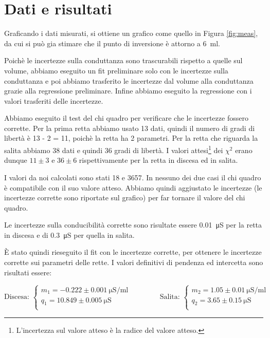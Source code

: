 \section*{Dati e risultati}

Graficando i dati misurati, si ottiene un grafico come quello in Figura \ref{fig:meas}, da cui si può gia stimare
che il punto di inversione è attorno a \SI{6}{\milli\litre}.

Poichè le incertezze sulla conduttanza sono trascurabili rispetto a quelle sul volume, abbiamo eseguito un fit preliminare
solo con le incertezze sulla conduttanza e poi abbiamo trasferito le incertezze dal volume alla conduttanza grazie alla regressione preliminare.
Infine abbiamo eseguito la regressione con i valori trasferiti delle incertezze. 


Abbiamo eseguito il test del chi quadro per verificare che le incertezze fossero corrette.
Per la prima retta abbiamo usato 13 dati, quindi il numero di gradi di libertà è 13 - 2 = 11, poichè
la retta ha 2 parametri. Per la retta che riguarda la salita abbiamo 38 dati e quindi 36 gradi di libertà.
I valori attesi\footnote{L'incertezza sul valore atteso è la radice del valore atteso.} dei $\chi^2$ erano
dunque $11 \pm 3$ e $36 \pm 6$ rispettivamente per la retta in discesa ed in salita.

I valori da noi calcolati sono stati 18 e 3657. In nessuno dei due casi il chi quadro è compatibile con il suo valore atteso.
Abbiamo quindi aggiustato le incertezze (le incertezze corrette sono riportate sul grafico) per far tornare il valore del chi quadro. 

Le incertezze sulla conducibilità corrette sono risultate essere \SI{0.01}{\micro\siemens} per la retta in discesa e di
\SI{0.3}{\micro\siemens} per quella in salita.

È stato quindi rieseguito il fit con le incertezze corrette, per ottenere le incertezze corrette sui parametri delle rette.
I valori definitivi di pendenza ed intercetta sono risultati essere:

\begin{equation*}
    \text{Discesa: }
    \left\{    
    \begin{array}{l}
        m_1 = -0.222 \pm 0.001 ~ \si{\micro\siemens\per\milli\litre} \\
        q_1 = 10.849 \pm 0.005 ~ \si{\micro\siemens} \\
    \end{array}
    \right.
    \qquad
    \qquad
    \text{Salita: }
    \left\{    
        \begin{array}{l}
        m_2 = 1.05 \pm 0.01 ~ \si{\micro\siemens\per\milli\litre} \\
        q_2 = 3.65 \pm 0.15 ~ \si{\micro\siemens} \\
    \end{array}
    \right.
\end{equation*}

